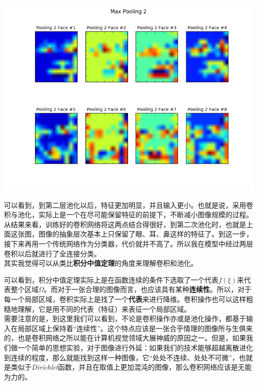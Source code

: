 \documentclass{article}
\begin{document}
\begin{center}
\includegraphics[width=0.8\linewidth]{../image/pool2.png}\\
\end{center}

可以看到，到第二层池化以后，特征更加明显，并且输入更小。也就是说，采用卷积与池化，实际上是一个在尽可能保留特征的前提下，不断减小图像规模的过程。从结果来看，训练好的卷积网络将这两点结合得很好，到第二次池化时，也就是上面这张图，图像的抽象层次基本上只保留了眼、耳、鼻这样的特征了。到这一步，接下来再用一个传统网络作为分类器，代价就并不高了。所以我在模型中经过两层卷积以后就进行了全连接分类。\\

其实我觉得可以从类比\textbf{积分中值定理}的角度来理解卷积和池化。\\

\noindent
{}

\bigskip

可以看到，积分中值定理实际上是在函数连续的条件下选取了一个代表$f(\xi)$来代表整个区域$\Omega$。而对于一张合理的图像而言，也应该具有某种\textbf{连续性}。所以，对于每一个局部区域，卷积实际上是找了一个\textbf{代表}来进行降维。卷积操作也可以这样粗糙地理解，它是用不同的代表（特征）来表征一个局部区域。\\

需要注意的是，到这里我们可以看到，不论是卷积操作亦或是池化操作，都基于输入在局部区域上保持着“连续性”。这个特点应该是一张合乎情理的图像所与生俱来的，也是卷积网络之所以能在计算机视觉领域大展神威的原因之一。但是，如果我们做一个简单的思想实验，对于图像进行外延：如果我们的技术能够超越离散进化到连续的程度，那么就能找到这样一种图像，它“处处不连续、处处不可微”，也就是类似于\emph{Dirichlet}函数，并且在取值上更加混沌的图像，那么卷积网络应该是无能为力的。
\end{document}
